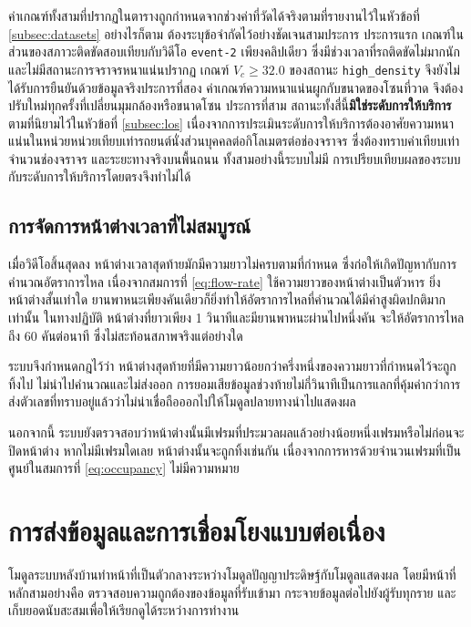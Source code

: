 ค่าเกณฑ์ทั้งสามที่ปรากฏในตารางถูกกำหนดจากช่วงค่าที่วัดได้จริงตามที่รายงานไว้ในหัวข้อที่ \ref{subsec:datasets}  อย่างไรก็ตาม ต้องระบุข้อจำกัดไว้อย่างชัดเจนสามประการ  ประการแรก เกณฑ์ในส่วนของสภาวะติดขัดสอบเทียบกับวิดีโอ \texttt{event-2} เพียงคลิปเดียว ซึ่งมีช่วงเวลาที่รถติดขัดไม่มากนักและไม่มีสถานะการจราจรหนาแน่นปรากฏ เกณฑ์ $V_c \geq 32.0$ ของสถานะ \texttt{high\_density} จึงยังไม่ได้รับการยืนยันด้วยข้อมูลจริงประการที่สอง ค่าเกณฑ์ความหนาแน่นผูกกับขนาดของโซนที่วาด จึงต้องปรับใหม่ทุกครั้งที่เปลี่ยนมุมกล้องหรือขนาดโซน  ประการที่สาม สถานะทั้งสี่นี้\textbf{มิใช่ระดับการให้บริการ}ตามที่นิยามไว้ในหัวข้อที่ \ref{subsec:los} เนื่องจากการประเมินระดับการให้บริการต้องอาศัยความหนาแน่นในหน่วยหน่วยเทียบเท่ารถยนต์นั่งส่วนบุคคลต่อกิโลเมตรต่อช่องจราจร ซึ่งต้องทราบค่าเทียบเท่า จำนวนช่องจราจร และระยะทางจริงบนพื้นถนน ทั้งสามอย่างนี้ระบบไม่มี  การเปรียบเทียบผลของระบบกับระดับการให้บริการโดยตรงจึงทำไม่ได้

\subsection{การจัดการหน้าต่างเวลาที่ไม่สมบูรณ์}
\label{subsec:partial-window}

เมื่อวิดีโอสิ้นสุดลง หน้าต่างเวลาสุดท้ายมักมีความยาวไม่ครบตามที่กำหนด ซึ่งก่อให้เกิดปัญหากับการคำนวณอัตราการไหล เนื่องจากสมการที่ \ref{eq:flow-rate} ใช้ความยาวของหน้าต่างเป็นตัวหาร ยิ่งหน้าต่างสั้นเท่าใด ยานพาหนะเพียงคันเดียวก็ยิ่งทำให้อัตราการไหลที่คำนวณได้มีค่าสูงผิดปกติมากเท่านั้น  ในทางปฏิบัติ หน้าต่างที่ยาวเพียง 1 วินาทีและมียานพาหนะผ่านไปหนึ่งคัน จะให้อัตราการไหลถึง 60 คันต่อนาที ซึ่งไม่สะท้อนสภาพจริงแต่อย่างใด

ระบบจึงกำหนดกฎไว้ว่า หน้าต่างสุดท้ายที่มีความยาวน้อยกว่าครึ่งหนึ่งของความยาวที่กำหนดไว้จะถูกทิ้งไป ไม่นำไปคำนวณและไม่ส่งออก  การยอมเสียข้อมูลช่วงท้ายไม่กี่วินาทีเป็นการแลกที่คุ้มค่ากว่าการส่งตัวเลขที่ทราบอยู่แล้วว่าไม่น่าเชื่อถือออกไปให้โมดูลปลายทางนำไปแสดงผล

นอกจากนี้ ระบบยังตรวจสอบว่าหน้าต่างนั้นมีเฟรมที่ประมวลผลแล้วอย่างน้อยหนึ่งเฟรมหรือไม่ก่อนจะปิดหน้าต่าง หากไม่มีเฟรมใดเลย หน้าต่างนั้นจะถูกทิ้งเช่นกัน เนื่องจากการหารด้วยจำนวนเฟรมที่เป็นศูนย์ในสมการที่ \ref{eq:occupancy} ไม่มีความหมาย

\section{การส่งข้อมูลและการเชื่อมโยงแบบต่อเนื่อง}
\label{sec:realtime-delivery}

โมดูลระบบหลังบ้านทำหน้าที่เป็นตัวกลางระหว่างโมดูลปัญญาประดิษฐ์กับโมดูลแสดงผล โดยมีหน้าที่หลักสามอย่างคือ ตรวจสอบความถูกต้องของข้อมูลที่รับเข้ามา กระจายข้อมูลต่อไปยังผู้รับทุกราย และเก็บยอดนับสะสมเพื่อให้เรียกดูได้ระหว่างการทำงาน

